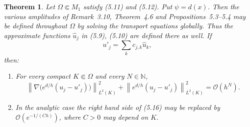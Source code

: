 \documentclass[11pt,a4paper]{article}
\newcommand{\N}{\mathbb N}
\newcommand{\cO}{\mathcal O}
\newcommand{\norm}[1]{\left\lVert #1\right\rVert}
\numberwithin{equation}{section}
\newtheorem{theorem}{Theorem}[section]
\theoremstyle{remark}
\begin{document}
\begin{theorem}
Let $\Omega\Subset M_1$ satisfy (5.11) and (5.12). Put $\psi=d(x)$. Then the various amplitudes of Remark~3.10, Theorem~4.6 and Propositions~5.3--5.4 may be defined throughout $\Omega$ by solving the transport equations globally. Thus the approximate functions $\widehat u_j$ in (5.9), (5.10) are defined there as well. If
\[
u'_j=\sum_k c_{j,k}\widehat u_k,
\]
then:

\begin{enumerate}[label=(\Alph*)]
\item For every compact $K\Subset\Omega$ and every $N\in\N$,
\begin{equation}
\norm{\nabla\bigl(e^{d/h}(u_j-u'_j)\bigr)}_{L^2(K)}^2
+\norm{e^{d/h}(u_j-u'_j)}_{L^2(K)}^2
=\cO(h^N).
\tag{5.16}
\end{equation}
\item In the analytic case the right hand side of (5.16) may be replaced by $\cO(e^{-1/(Ch)})$, where $C>0$ may depend on $K$.
\end{enumerate}
\end{theorem}
\end{document}
